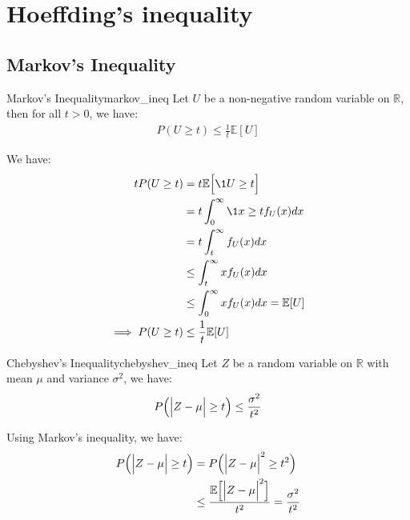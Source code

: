 \newpage\section{Hoeffding's inequality}

\subsection{Markov's Inequality}
\begin{proposition}{Markov's Inequality}{markov_ineq}
    Let $U$ be a non-negative random variable on $\mathbb{R}$, then for all $t>0$, we have:
    \begin{align*}
        P(U \ge t) \le \frac{1}{t}\mathbb{E}[U]
    \end{align*}
\end{proposition}

\begin{proof*}
    We have:
    \begin{align*}
        tP(U \ge t) 
            &= t\mathbb{E}\bigSquare{\1{U\ge t}} \\
            &= t\int_0^\infty \1{x \ge t} f_U(x)dx \\
            &= t\int_t^\infty f_U(x)dx \\
            &\le \int_t^\infty xf_U(x)dx \\
            &\le \int_0^\infty xf_U(x)dx = \mathbb{E}[U] \\
        \implies P(U\ge t) &\le \frac{1}{t}\mathbb{E}[U]
    \end{align*}
\end{proof*}

\begin{corollary}{Chebyshev's Inequality}{chebyshev_ineq}
    Let $Z$ be a random variable on $\mathbb{R}$ with mean $\mu$ and variance $\sigma^2$, we have:
    \begin{align*}
        P\Big( 
            \Big| 
                Z - \mu
             \Big| \ge t
         \Big) \le \frac{\sigma^2}{t^2}
    \end{align*}
\end{corollary}

\begin{proof*}
    Using Markov's inequality, we have:
    \begin{align*}
        P\Big( 
            \Big| 
                Z - \mu
             \Big| \ge t
         \Big) &= 
        P\Big( 
            \Big| 
                Z - \mu
             \Big|^2 \ge t^2
         \Big) \\
        &\le \frac{\mathbb{E}\Big[ \Big| Z-\mu \Big|^2 \Big]}{t^2} = \frac{\sigma^2}{t^2}
    \end{align*}
\end{proof*}

